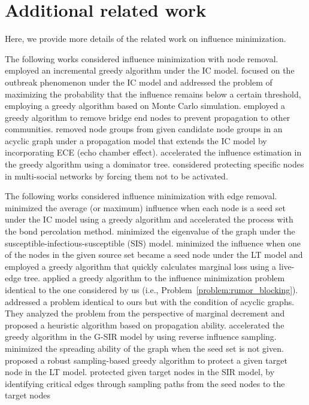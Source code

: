 \section{Additional related work}\label{app:rel_wk_detail}
Here, we provide more details of the related work on influence minimization.

The following works considered influence minimization with node removal.
\citet{wang2013negative} employed an incremental greedy algorithm under the IC model.
\citet{chang2016guarantee} focused on the outbreak phenomenon under the IC model and addressed the problem of maximizing the probability that the influence remains below a certain threshold, employing a greedy algorithm based on Monte Carlo simulation.
\citet{zheng2018least} employed a greedy algorithm to remove bridge end nodes to prevent propagation to other communities.
\citet{zhu2021misinformation} removed node groups from given candidate node groups in an acyclic graph under a propagation model that extends the IC model by incorporating ECE (echo chamber effect).
\citet{xie2023minimizing} accelerated the influence estimation in the greedy algorithm using a dominator tree.
\citet{ni2023misinformation} considered protecting specific nodes in multi-social networks by forcing them not to be activated.

The following works considered influence minimization with edge removal.
\citet{Kimura2009blocking} minimized the average (or maximum) influence when each node is a seed set under the IC model using a greedy algorithm and accelerated the process with the bond percolation method.
\citet{tong2012gelling} minimized the eigenvalue of the graph under the susceptible-infectious-susceptible (SIS) model.
\citet{khalil2014scalable} minimized the influence when one of the nodes in the given source set became a seed node under the LT model and employed a greedy algorithm that quickly calculates marginal loss using a live-edge tree.
\citet{yao2015minimizing} applied a greedy algorithm to the influence minimization problem identical to the one considered by us (i.e., Problem~\ref{problem:rumor_blocking}).
\citet{yan2019rumor} addressed a problem identical to ours but with the condition of acyclic graphs. They analyzed the problem from the perspective of marginal decrement and proposed a heuristic algorithm based on propagation ability.
\citet{yi2022edge} accelerated the greedy algorithm in the G-SIR model by using reverse influence sampling.
\citet{zareie2022rumour} minimized the spreading ability of the graph when the seed set is not given.
\citet{wang2020efficient} proposed a robust sampling-based greedy algorithm to protect a given target node in the LT model.
\citet{jiang2022rumordecay} protected given target nodes in the SIR model, by identifying critical edges through sampling paths from the seed nodes to the target nodes

